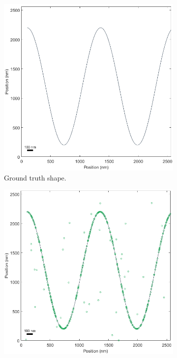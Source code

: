 \documentclass[10pt,a4paper]{article}
\begin{document}
\begin{figure}
	\begin{subfigure}[b]{.45\textwidth}
		\centering
		\includegraphics[width=\textwidth]{./figures/groundTruthcurve.png}
		\caption[Step1]{Ground truth shape.\newline}
		\label{fig:simStep1}
	\end{subfigure}
	\hfill
	\begin{subfigure}[b]{0.45\textwidth}
		\centering
		\includegraphics[width=\textwidth]{./figures/groundTruthcurveAndPoints.png}

\end{subfigure}
\end{figure}
\end{document}
